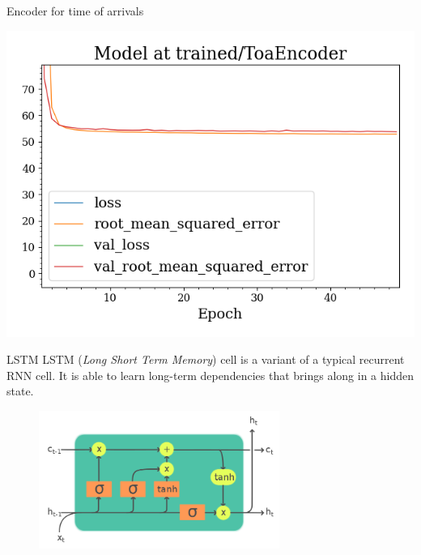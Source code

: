 \documentclass{beamer}
\begin{document}
\begin{frame}{Encoder for time of arrivals}

    \includegraphics[width=\textwidth]{figures/ENC_history.png}
    
\end{frame}


\begin{frame}{LSTM}
    LSTM (\textit{Long Short Term Memory}) cell is a variant of a typical recurrent RNN cell.
    It is able to learn long-term dependencies that brings along in a hidden state.

    \begin{figure}
        \centering
        \includegraphics[width=0.7\textwidth]{figures/LSTM_Cell.svg.png}
    \end{figure}
    
\end{frame}
\end{document}
